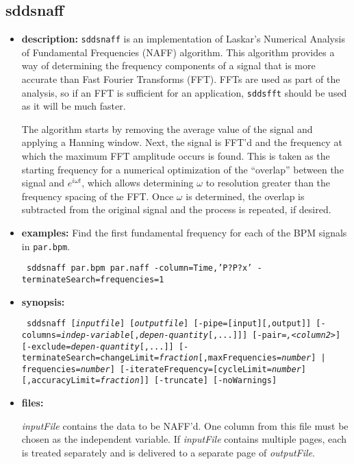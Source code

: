 \begin{latexonly}
\newpage
\end{latexonly}
\subsection{sddsnaff}
\label{sddsnaff}

\begin{itemize}
\item {\bf description:}
{\tt sddsnaff} is an implementation of Laskar's Numerical Analysis of Fundamental
Frequencies (NAFF) algorithm.  This algorithm provides a way of determining the frequency
components of a signal that is more accurate than Fast Fourier Transforms (FFT). 
FFTs are used as part of the analysis, so if an FFT is sufficient for an application,
{\tt sddsfft} should be used as it will be much faster.

The algorithm starts by removing the average value of the signal and
applying a Hanning window.  Next, the signal is FFT'd and the
frequency at which the maximum FFT amplitude occurs is found.  This is
taken as the starting frequency for a numerical optimization of the
``overlap'' between the signal and $e^{i\omega t}$, which allows
determining $\omega$ to resolution greater than the frequency spacing
of the FFT.  Once $\omega$ is determined, the overlap is subtracted
from the original signal and the process is repeated, if desired.

\item {\bf examples:} 
Find the first fundamental frequency for each of the BPM signals in {\tt par.bpm}.
\begin{flushleft}{\tt
sddsnaff par.bpm par.naff -column=Time,'P?P?x' -terminateSearch=frequencies=1
}\end{flushleft}
\item {\bf synopsis:} 
\begin{flushleft}{\tt
sddsnaff [{\em inputfile}] [{\em outputfile}]
[-pipe=[input][,output]]
[-columns={\em indep-variable}[,{\em depen-quantity}[,...]]] 
[-pair={\em<column1>,<column2>}]
[-exclude={\em depen-quantity}[,...]]
[-terminateSearch={changeLimit={\em fraction}[,maxFrequencies={\em number}] | frequencies={\em number}}]
[-iterateFrequency=[cycleLimit={\em number}][,accuracyLimit={\em fraction}]]
[-truncate] [-noWarnings]
}\end{flushleft}
\item {\bf files:}

{\em inputFile} contains the data to be NAFF'd.  One column from this
file must be chosen as the independent variable.  If {\em inputFile}
contains multiple pages, each is treated separately and is delivered
to a separate page of {\em outputFile}.


\end{itemize}
